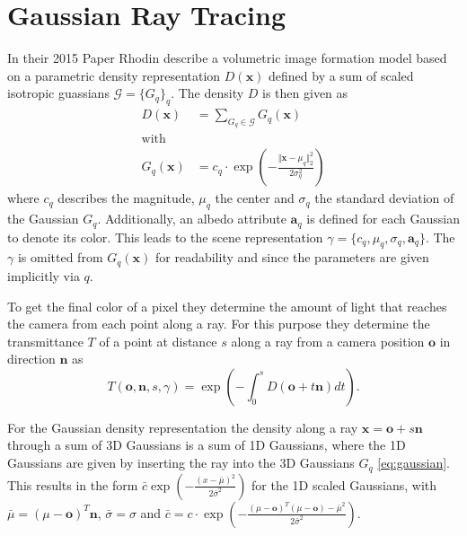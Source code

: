 \documentclass[a4paper, 11pt]{memoir}
\begin{document}
    \section{Gaussian Ray Tracing}
    \label{sec:int_grt}
    In their 2015 Paper  \cite{Rhodin:2015} Rhodin \etal describe a volumetric image formation
    model based on a parametric density representation $D(\mathbf{x})$ defined by a sum of scaled isotropic guassians
    $\mathcal{G} = \{ G_q \}_q$. The density $D$ is then given as
    \begin{align}
        D(\mathbf{x}) &= \sum_{G_q \in \mathcal{G}} G_q(\mathbf{x})
        \label{eq:density}\\
        \text{with} \nonumber\\
        G_q(\mathbf{x}) &= c_q \cdot \exp{\left( - \frac{\Vert\mathbf{x} - \mu_q\Vert_2^2}{2\sigma_q^2} \right)}
        \label{eq:gaussian}
    \end{align}
    where $c_q$ describes the magnitude, $\mu_q$ the center and $\sigma_q$ the standard deviation of the Gaussian $G_q$.
    Additionally, an \gls{albedo} attribute $\mathbf{a}_q$ is defined for each Gaussian to denote its color. This leads
    to the scene representation $\gamma = \{ c_q, \mu_q, \sigma_q, \mathbf{a}_q \}$. The $\gamma$ is omitted from
    $G_q(\mathbf{x})$ for readability and since the parameters are given implicitly via $q$.

    To get the final color of a pixel they determine the amount of light that reaches the camera from each point
    along a ray. For this purpose they determine the \gls{transmittance} $T$ of a point at distance $s$ along a ray from
    a camera position $\mathbf{o}$ in direction $\mathbf{n}$ as
    \begin{equation}
        T(\mathbf{o}, \mathbf{n}, s, \gamma) = \exp{\left( - \int_0^s D(\mathbf{o} + t\mathbf{n}) dt \right)}.
        \label{eq:transmittance}
    \end{equation}

    For the Gaussian density representation the density along a ray $\mathbf{x} = \mathbf{o} + s\mathbf{n}$ through a
    sum of 3D Gaussians is a sum of 1D Gaussians, where the 1D Gaussians are given by inserting the ray into the
    3D Gaussians $G_q$ \eqref{eq:gaussian}. This results in the form
    $\bar{c} \exp{\left( - \frac{(x - \bar{\mu})^2}{2\bar{\sigma}^2} \right)}$ for the 1D scaled Gaussians, with
    $\bar{\mu} = (\mu - \mathbf{o})^T\mathbf{n}$, $\bar{\sigma} = \sigma$ and
    $\bar{c} = c \cdot \exp{\left( - \frac{(\mu - \mathbf{o})^T(\mu - \mathbf{o}) - \bar{\mu}^2}{2\bar{\sigma}^2} \right)}$.
\end{document}
